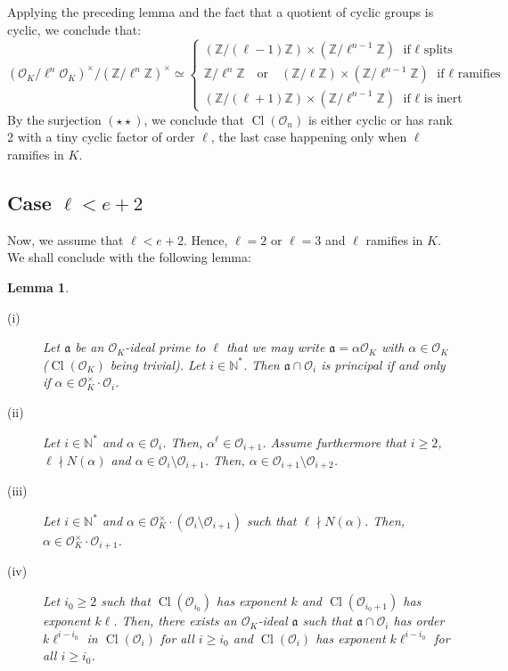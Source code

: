 \documentclass[a4paper,10pt]{report}
\theoremstyle{definition}
\theoremstyle{plain}
\newtheorem{lemma}[definition]{Lemma}
\theoremstyle{definition}
\newcommand{\N}{\mathbb{N}}
\newcommand{\Z}{\mathbb{Z}}
\newcommand{\mO}{\mathcal{O}}
\renewcommand{\(}{\left(}
\renewcommand{\)}{\right)}
\newcommand{\mf}[1]{\mathfrak{#1}}
\DeclareMathOperator{\Cl}{Cl}
\begin{document}
Applying the preceding lemma and the fact that a quotient of cyclic groups is cyclic, we conclude that:
\[(\mO_K/\ell^n\mO_K)^\times/(\Z/\ell^n\Z)^\times \simeq \left\{ \begin{array}{l} 
(\Z/(\ell-1)\Z)\times(\Z/\ell^{n-1}\Z) \mbox{ if $\ell$ splits}\\
\Z/\ell^{n}\Z \quad \mbox{or} \quad (\Z/\ell\Z)\times(\Z/\ell^{n-1}\Z) \mbox{ if $\ell$ ramifies}\\ 
(\Z/(\ell+1)\Z)\times(\Z/\ell^{n-1}\Z)  \mbox{ if $\ell$ is inert}
\end{array}\right.\]
By the surjection $(\star\star)$, we conclude that $\Cl(\mO_n)$ is either cyclic or has rank $2$ with a tiny cyclic factor of order $\ell$, the last case happening only when $\ell$ ramifies in $K$.

\subsection{Case $\ell< e+2$}

Now, we assume that $\ell< e+2$. Hence, $\ell=2$ or $\ell=3$ and $\ell$ ramifies in $K$.  We shall conclude with the following lemma:

\begin{lemma}\label{lemma 18}

\begin{description}
\item[(i)] Let $\mf{a}$ be an $\mO_K$-ideal prime to $\ell$ that we may write $\mf{a}=\alpha\mO_K$ with $\alpha\in\mO_K$ ($\Cl(\mO_K)$ being trivial). Let $i\in\N^*$. Then $\mf{a}\cap\mO_i$ is principal if and only if $\alpha\in\mO_K^\times\cdot \mO_i$.

\item[(ii)] Let $i\in\N^*$ and $\alpha\in\mO_i$. Then, $\alpha^\ell\in\mO_{i+1}$. Assume furthermore that $i\geq 2$, $\ell\nmid N(\alpha)$ and $\alpha\in\mO_i\setminus\mO_{i+1}$. Then, $\alpha\in\mO_{i+1}\setminus\mO_{i+2}$.

\item[(iii)] Let $i\in\N^*$ and $\alpha\in \mO_K^\times\cdot(\mO_i\setminus\mO_{i+1})$ such that $\ell\nmid N(\alpha)$. Then, $\alpha\in\mO_K^\times\cdot\mO_{i+1}$.

\item[(iv)] Let $i_0\geq 2$ such that $\Cl(\mO_{i_0})$ has exponent $k$ and $\Cl(\mO_{i_0+1})$ has exponent $k\ell$. Then, there exists an $\mO_K$-ideal $\mf{a}$ such that $\mf{a}\cap\mO_i$ has order $k\ell^{i-i_0}$ in $\Cl(\mO_i)$ for all $i\geq i_0$ and $\Cl(\mO_i)$ has exponent $k\ell^{i-i_0}$ for all $i\geq i_0$.
\end{description}
\end{lemma}
\end{document}
